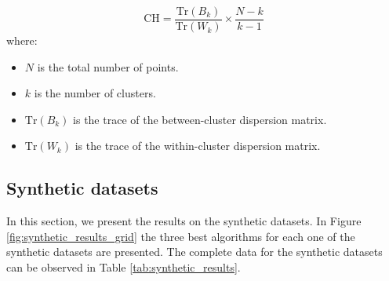 \documentclass[
	10pt,
	parskip=half-,	
	paper=a4,
	english
	]{scrartcl}
\begin{document}
\begin{equation}
    \text{CH} = \frac{\text{Tr}(B_k)}{\text{Tr}(W_k)} \times \frac{N - k}{k-1}
    \label{eq13}
\end{equation}
where:
\begin{itemize}
    \item $N$ is the total number of points.
    \item $k$ is the number of clusters.
    \item $\text{Tr}(B_k)$ is the trace of the between-cluster dispersion matrix.
    \item $\text{Tr}(W_k)$ is the trace of the within-cluster dispersion matrix.
\end{itemize}

\subsection{Synthetic datasets}

In this section, we present the results on the synthetic datasets. In Figure \ref{fig:synthetic_results_grid} the three best algorithms for each one of the synthetic datasets are presented. The complete data for the synthetic datasets can be observed in Table \ref{tab:synthetic_results}. 
\end{document}
